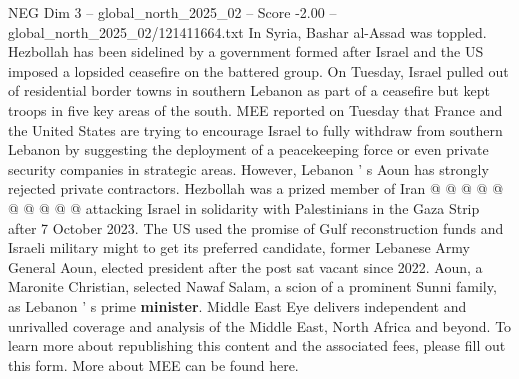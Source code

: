\begin{textsample}{NEG Dim 3 – global\_north\_2025\_02 – Score -2.00 – global\_north\_2025\_02/121411664.txt}
In Syria, Bashar al-Assad was toppled.
Hezbollah has been sidelined by a government formed after Israel and the US imposed a lopsided ceasefire on the battered group.
On Tuesday, Israel pulled out of residential border towns in southern Lebanon as part of a ceasefire but kept troops in five key areas of the south.
MEE reported on Tuesday that France and the United States are trying to encourage Israel to fully withdraw from southern Lebanon by suggesting the deployment of a peacekeeping force or even private security companies in strategic areas.
However, Lebanon ' s Aoun has strongly rejected private contractors.
Hezbollah was a prized member of Iran @ @ @ @ @ @ @ @ @ @ attacking Israel in solidarity with Palestinians in the Gaza Strip after 7 October 2023.
The US used the promise of Gulf reconstruction funds and Israeli military might to get its preferred candidate, former Lebanese Army General Aoun, elected president after the post sat vacant since 2022.
Aoun, a Maronite Christian, selected Nawaf Salam, a scion of a prominent Sunni family, as Lebanon ' s prime \textbf{minister}.
Middle East Eye delivers independent and unrivalled coverage and analysis of the Middle East, North Africa and beyond.
To learn more about republishing this content and the associated fees, please fill out this form.
More about MEE can be found here.

\end{textsample}
